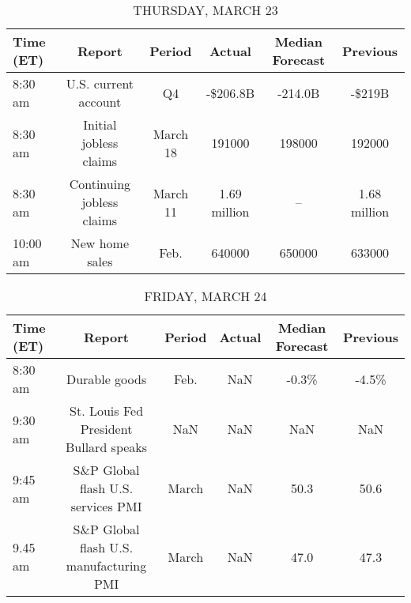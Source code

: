 \documentclass{article}%
\begin{document}
\begin{table}[htbp]%
\caption{THURSDAY, MARCH 23}%
\centering%
\begin{adjustbox}{width=1\textwidth}%
\begin{tabular}{lccccc}
\toprule
Time (ET) &                    Report &   Period &       Actual & Median Forecast &     Previous \\
\midrule
  8:30 am &      U.S. current account &       Q4 &     -\$206.8B &         -214.0B &       -\$219B \\
  8:30 am &    Initial jobless claims & March 18 &       191000 &          198000 &       192000 \\
  8:30 am & Continuing jobless claims & March 11 & 1.69 million &              -- & 1.68 million \\
 10:00 am &            New home sales &     Feb. &       640000 &          650000 &       633000 \\
\bottomrule
\end{tabular}
%
\end{adjustbox}%
\end{table}

%


\begin{table}[htbp]%
\caption{FRIDAY, MARCH 24}%
\centering%
\begin{adjustbox}{width=1\textwidth}%
\begin{tabular}{lccccc}
\toprule
Time (ET) &                                  Report & Period & Actual & Median Forecast & Previous \\
\midrule
  8:30 am &                           Durable goods &   Feb. &    NaN &           -0.3\% &    -4.5\% \\
  9:30 am &  St. Louis Fed President Bullard speaks &    NaN &    NaN &             NaN &      NaN \\
  9:45 am &      S\&P Global flash U.S. services PMI &  March &    NaN &            50.3 &     50.6 \\
  9.45 am & S\&P Global flash U.S. manufacturing PMI &  March &    NaN &            47.0 &     47.3 \\
\bottomrule
\end{tabular}
%
\end{adjustbox}%
\end{table}
\end{document}

